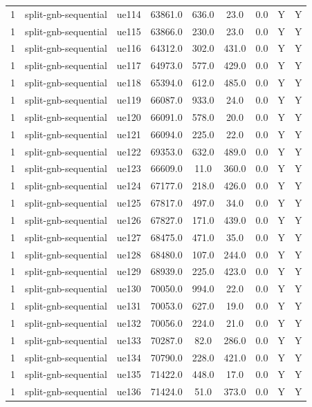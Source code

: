 \begin{table}[ht]
\begin{tabular}{|c|c|c|c|c|c|c|c|c|}
1 & split-gnb-sequential & ue114 & 63861.0 & 636.0 & 23.0 & 0.0 & Y & Y \\
1 & split-gnb-sequential & ue115 & 63866.0 & 230.0 & 23.0 & 0.0 & Y & Y \\
1 & split-gnb-sequential & ue116 & 64312.0 & 302.0 & 431.0 & 0.0 & Y & Y \\
1 & split-gnb-sequential & ue117 & 64973.0 & 577.0 & 429.0 & 0.0 & Y & Y \\
1 & split-gnb-sequential & ue118 & 65394.0 & 612.0 & 485.0 & 0.0 & Y & Y \\
1 & split-gnb-sequential & ue119 & 66087.0 & 933.0 & 24.0 & 0.0 & Y & Y \\
1 & split-gnb-sequential & ue120 & 66091.0 & 578.0 & 20.0 & 0.0 & Y & Y \\
1 & split-gnb-sequential & ue121 & 66094.0 & 225.0 & 22.0 & 0.0 & Y & Y \\
1 & split-gnb-sequential & ue122 & 69353.0 & 632.0 & 489.0 & 0.0 & Y & Y \\
1 & split-gnb-sequential & ue123 & 66609.0 & 11.0 & 360.0 & 0.0 & Y & Y \\
1 & split-gnb-sequential & ue124 & 67177.0 & 218.0 & 426.0 & 0.0 & Y & Y \\
1 & split-gnb-sequential & ue125 & 67817.0 & 497.0 & 34.0 & 0.0 & Y & Y \\
1 & split-gnb-sequential & ue126 & 67827.0 & 171.0 & 439.0 & 0.0 & Y & Y \\
1 & split-gnb-sequential & ue127 & 68475.0 & 471.0 & 35.0 & 0.0 & Y & Y \\
1 & split-gnb-sequential & ue128 & 68480.0 & 107.0 & 244.0 & 0.0 & Y & Y \\
1 & split-gnb-sequential & ue129 & 68939.0 & 225.0 & 423.0 & 0.0 & Y & Y \\
1 & split-gnb-sequential & ue130 & 70050.0 & 994.0 & 22.0 & 0.0 & Y & Y \\
1 & split-gnb-sequential & ue131 & 70053.0 & 627.0 & 19.0 & 0.0 & Y & Y \\
1 & split-gnb-sequential & ue132 & 70056.0 & 224.0 & 21.0 & 0.0 & Y & Y \\
1 & split-gnb-sequential & ue133 & 70287.0 & 82.0 & 286.0 & 0.0 & Y & Y \\
1 & split-gnb-sequential & ue134 & 70790.0 & 228.0 & 421.0 & 0.0 & Y & Y \\
1 & split-gnb-sequential & ue135 & 71422.0 & 448.0 & 17.0 & 0.0 & Y & Y \\
1 & split-gnb-sequential & ue136 & 71424.0 & 51.0 & 373.0 & 0.0 & Y & Y \\

\end{tabular}
\end{table}
